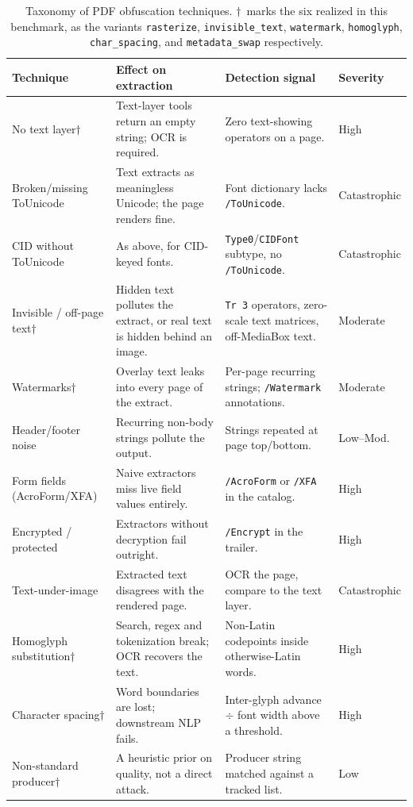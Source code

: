 \documentclass[11pt]{article}
\newcommand{\variant}[1]{\texttt{#1}}
\begin{document}
\begin{table}[tbp]
\centering
\caption{Taxonomy of PDF obfuscation techniques. $\dagger$~marks the six
  realized in this benchmark, as the variants \variant{rasterize},
  \variant{invisible\_text}, \variant{watermark}, \variant{homoglyph},
  \variant{char\_spacing}, and \variant{metadata\_swap} respectively.}
\label{tab:taxonomy}
\footnotesize
\setlength{\tabcolsep}{4pt}
\renewcommand{\arraystretch}{1.25}
\begin{tabular}{@{}p{3.0cm}p{4.0cm}p{4.4cm}l@{}}
\toprule
\textbf{Technique} & \textbf{Effect on extraction} &
  \textbf{Detection signal} & \textbf{Severity}\\
\midrule
No text layer$\dagger$ &
  Text-layer tools return an empty string; OCR is required. &
  Zero text-showing operators on a page. & High\\
Broken/missing ToUnicode &
  Text extracts as meaningless Unicode; the page renders fine. &
  Font dictionary lacks \texttt{/ToUnicode}. & Catastrophic\\
CID without ToUnicode &
  As above, for CID-keyed fonts. &
  \texttt{Type0}/\texttt{CIDFont} subtype, no \texttt{/ToUnicode}. &
  Catastrophic\\
Invisible / off-page text$\dagger$ &
  Hidden text pollutes the extract, or real text is hidden behind an
  image. &
  \texttt{Tr~3} operators, zero-scale text matrices, off-MediaBox text.
  & Moderate\\
Watermarks$\dagger$ &
  Overlay text leaks into every page of the extract. &
  Per-page recurring strings; \texttt{/Watermark} annotations. &
  Moderate\\
Header/footer noise &
  Recurring non-body strings pollute the output. &
  Strings repeated at page top/bottom. & Low--Mod.\\
Form fields (AcroForm/XFA) &
  Naive extractors miss live field values entirely. &
  \texttt{/AcroForm} or \texttt{/XFA} in the catalog. & High\\
Encrypted / protected &
  Extractors without decryption fail outright. &
  \texttt{/Encrypt} in the trailer. & High\\
Text-under-image &
  Extracted text disagrees with the rendered page. &
  OCR the page, compare to the text layer. & Catastrophic\\
Homoglyph substitution$\dagger$ &
  Search, regex and tokenization break; OCR recovers the text. &
  Non-Latin codepoints inside otherwise-Latin words. & High\\
Character spacing$\dagger$ &
  Word boundaries are lost; downstream NLP fails. &
  Inter-glyph advance $\div$ font width above a threshold. & High\\
Non-standard producer$\dagger$ &
  A heuristic prior on quality, not a direct attack. &
  Producer string matched against a tracked list. & Low\\
\bottomrule
\end{tabular}
\end{table}
\end{document}
